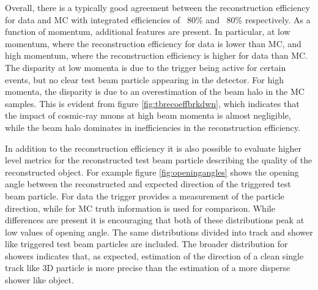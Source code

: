 Overall, there is a typically good agreement between the reconstruction efficiency for data and MC with integrated efficiencies of ~80\% and ~80\% respectively.  As a function of momentum, additional features are present.  In particular, at low momentum, where the reconstruction efficiency for data is lower than MC, and high momentum, where the reconstruction efficiency is higher for data than MC.  The disparity at low momenta is due to the trigger being active for certain events, but no clear test beam particle appearing in the detector.   For high momenta, the disparity is due to an overestimation of the beam halo in the MC samples.  This is evident from figure \ref{fig:tbrecoeffbrkdwn}, which indicates that the impact of cosmic-ray muons at high beam momenta is almost negligible, while the beam halo dominates in inefficiencies in the reconstruction efficiency.  

In addition to the reconstruction efficiency it is also possible to evaluate higher level metrics for the reconstructed test beam particle describing the quality of the reconstructed object.  For example figure \ref{fig:openingangles} shows the opening angle between the reconstructed and expected direction of the triggered test beam particle.  For data the trigger provides a measurement of the particle direction, while for MC truth information is used for comparison.  While differences are present it is encouraging that both of these distributions peak at low values of opening angle.  The same distributions divided into track and shower like triggered test beam particles are included.  The broader distribution for showers indicates that, as expected, estimation of the direction of a clean single track like 3D particle is more precise than the estimation of a more disperse shower like object.   

